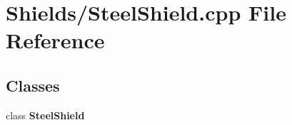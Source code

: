 \section{Shields/\-Steel\-Shield.cpp File Reference}
\label{_steel_shield_8cpp}
\subsection*{Classes}
\begin{DoxyCompactItemize}
\item 
class {\bf Steel\-Shield}
\end{DoxyCompactItemize}
